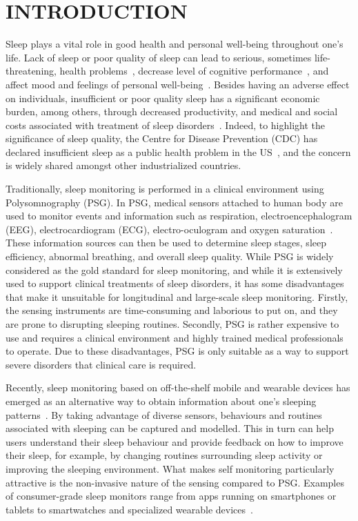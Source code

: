 \section{INTRODUCTION}\label{sec:1introduction}

Sleep plays a vital role in good health and personal well-being throughout one's life. Lack of sleep or poor quality of sleep can lead to
serious, sometimes life-threatening, health problems~\cite{altena2008sleep,chandola2010effect,lallukka2016contribution}, decrease level of
cognitive performance~\cite{alhola07sleep,akerstedt07altered}, and affect mood and feelings of personal
well-being~\cite{paunio09longitudinal,pilcher97sleep}. Besides having an adverse effect on individuals, insufficient or poor quality sleep
has a significant economic burden, among others, through decreased productivity, and medical and social costs associated with treatment of
sleep disorders~\cite{hafner17why}. Indeed, to highlight the significance of sleep quality, the Centre for Disease Prevention (CDC) has
declared insufficient sleep as a public health problem in the US~\cite{sleepreport}, and the concern is widely shared amongst other
industrialized countries.


Traditionally, sleep monitoring is performed in a clinical environment using Polysomnography (PSG). In PSG, medical
sensors attached to human body are used to monitor events and information such as respiration, electroencephalogram (EEG),
electrocardiogram (ECG), electro-oculogram and oxygen
saturation~\cite{ebrahimi2008automatic,saper2005hypothalamic,oropesa1999sleep,langkvist2012sleep}. These information sources can then be
used to determine sleep stages, sleep efficiency, abnormal breathing, and overall sleep quality. While PSG is widely considered as the gold
standard for sleep monitoring, and while it is extensively used to support clinical treatments of sleep disorders, it has some
disadvantages that make it unsuitable for longitudinal and large-scale sleep monitoring. Firstly, the sensing instruments are
time-consuming and laborious to put on, and they are prone to disrupting sleeping routines.  Secondly, PSG is rather expensive to use and
requires a clinical environment and highly trained medical professionals to operate. Due to these disadvantages, PSG is only suitable as a
way to support severe disorders that clinical care is required.


Recently, sleep monitoring based on off-the-shelf mobile and wearable devices has emerged as an alternative way to obtain information about
one's sleeping patterns~\cite{ko15consumer,shelgikar2016sleep}. By taking advantage of diverse sensors, behaviours and routines associated
with sleeping can be captured and modelled. This in turn can help users understand their sleep behaviour and provide feedback on how to
improve their sleep, for example, by changing routines surrounding sleep activity or improving the sleeping environment. What makes self
monitoring particularly attractive is the non-invasive nature of the sensing compared to PSG. Examples of consumer-grade sleep monitors
range from apps running on smartphones or tablets to smartwatches and specialized wearable
devices~\cite{zeo,Jawbone,SleepAndroid,fitbit,gu2016sleep,sleepmonitor}.

